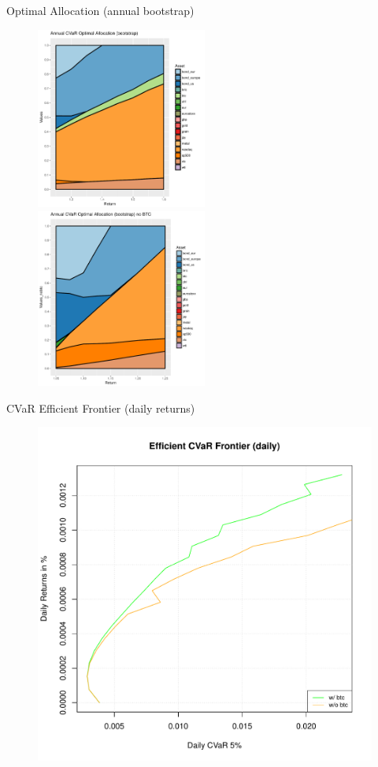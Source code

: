 \documentclass{beamer}
\begin{document}
\begin{frame}{Optimal Allocation (annual bootstrap)}
\begin{figure}
	\includegraphics[width=0.5\textwidth]{allocation_bootstrap_btc.pdf}
	\includegraphics[width=0.5\textwidth]{allocation_bootstrap_nobtc.pdf}
\end{figure}
\end{frame}

\begin{frame}{CVaR Efficient Frontier (daily returns)}
\begin{figure}
	\includegraphics[height= 0.8\textheight]{frontier_daily.pdf}
\end{figure}
\end{frame}
\end{document}
